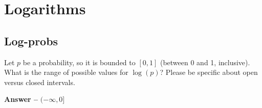 \documentclass[11pt,letterpaper]{article}
\theoremstyle{definition}
\begin{document}
%
%
%
%

\section{Logarithms}

\subsection{Log-probs}
Let $p$ be a probability, so it is bounded to $[0,1]$ (between 0 and 1, inclusive).
What is the range of possible values for $\log(p)$?  Please be specific about open versus closed intervals.

\textbf{ Answer -- }$(-\infty, 0]$
\end{document}
